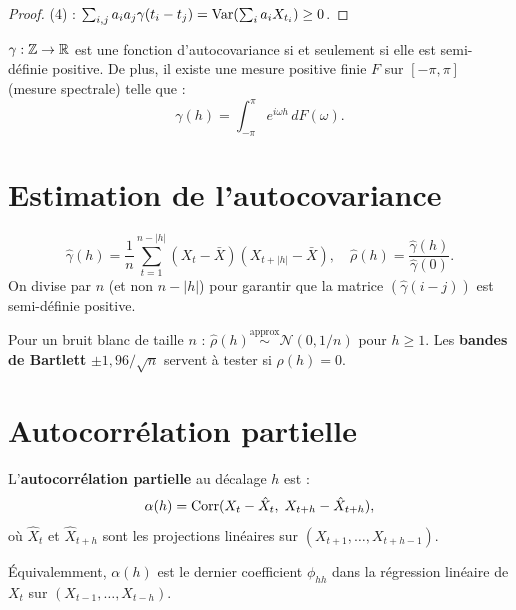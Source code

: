 \begin{proof}
(4) : $\sum_{i,j}a_ia_j\gamma(t_i-t_j)=\operatorname{Var}\!\left(\sum_i a_i X_{t_i}\right)\geq 0$.
\end{proof}

\begin{theoreme}[Herglotz]
$\gamma:\mathbb{Z}\to\mathbb{R}$ est une fonction d'autocovariance si et seulement si elle est semi-d\'efinie positive. De plus, il existe une mesure positive finie $F$ sur $[-\pi,\pi]$ (mesure spectrale) telle que :
\[
\gamma(h) = \int_{-\pi}^{\pi} e^{i\omega h}\,dF(\omega).
\]
\end{theoreme}

\section{Estimation de l'autocovariance}

\begin{definition}
\[
\hat{\gamma}(h) = \frac{1}{n}\sum_{t=1}^{n-|h|}(X_t-\bar{X})(X_{t+|h|}-\bar{X}), \quad \hat{\rho}(h)=\frac{\hat{\gamma}(h)}{\hat{\gamma}(0)}.
\]
On divise par $n$ (et non $n-|h|$) pour garantir que la matrice $(\hat{\gamma}(i-j))$ est semi-d\'efinie positive.
\end{definition}

\begin{theoreme}[Bartlett]
Pour un bruit blanc de taille $n$ : $\hat{\rho}(h)\stackrel{\text{approx}}{\sim}\mathcal{N}(0,1/n)$ pour $h\geq 1$. Les \textbf{bandes de Bartlett} $\pm 1{,}96/\sqrt{n}$ servent \`a tester si $\rho(h)=0$.
\end{theoreme}

\section{Autocorr\'elation partielle}

\begin{definition}[PACF]
L'\textbf{autocorr\'elation partielle} au d\'ecalage $h$ est :
\[
\alpha(h) = \operatorname{Corr}(X_t-\hat{X}_t,\;X_{t+h}-\hat{X}_{t+h}),
\]
o\`u $\hat{X}_t$ et $\hat{X}_{t+h}$ sont les projections lin\'eaires sur $(X_{t+1},\ldots,X_{t+h-1})$.

\'Equivalemment, $\alpha(h)$ est le dernier coefficient $\phi_{hh}$ dans la r\'egression lin\'eaire de $X_t$ sur $(X_{t-1},\ldots,X_{t-h})$.
\end{definition}

